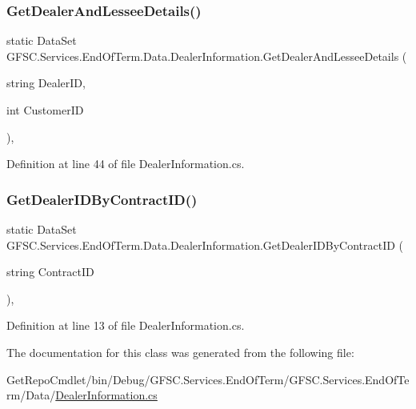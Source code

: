 \subsubsection{\texorpdfstring{Get\+Dealer\+And\+Lessee\+Details()}{GetDealerAndLesseeDetails()}}
{\footnotesize\ttfamily static Data\+Set G\+F\+S\+C.\+Services.\+End\+Of\+Term.\+Data.\+Dealer\+Information.\+Get\+Dealer\+And\+Lessee\+Details (\begin{DoxyParamCaption}\item[{string}]{Dealer\+ID,  }\item[{int}]{Customer\+ID }\end{DoxyParamCaption})\hspace{0.3cm}{\ttfamily [static]}, {\ttfamily [package]}}



Definition at line 44 of file Dealer\+Information.\+cs.

\mbox{\label{class_g_f_s_c_1_1_services_1_1_end_of_term_1_1_data_1_1_dealer_information_ad375c4647275317383243ef5afaf07a0}} 
\subsubsection{\texorpdfstring{Get\+Dealer\+I\+D\+By\+Contract\+I\+D()}{GetDealerIDByContractID()}}
{\footnotesize\ttfamily static Data\+Set G\+F\+S\+C.\+Services.\+End\+Of\+Term.\+Data.\+Dealer\+Information.\+Get\+Dealer\+I\+D\+By\+Contract\+ID (\begin{DoxyParamCaption}\item[{string}]{Contract\+ID }\end{DoxyParamCaption})\hspace{0.3cm}{\ttfamily [static]}, {\ttfamily [package]}}



Definition at line 13 of file Dealer\+Information.\+cs.



The documentation for this class was generated from the following file\+:\begin{DoxyCompactItemize}
\item 
Get\+Repo\+Cmdlet/bin/\+Debug/\+G\+F\+S\+C.\+Services.\+End\+Of\+Term/\+G\+F\+S\+C.\+Services.\+End\+Of\+Term/\+Data/\mbox{\hyperlink{_data_2_dealer_information_8cs}{Dealer\+Information.\+cs}}\end{DoxyCompactItemize}
